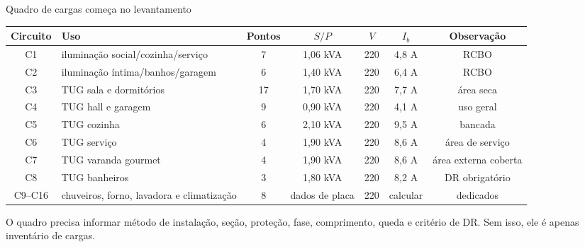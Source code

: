 \begin{frame}[shrink=5]{Quadro de cargas começa no levantamento}
\scriptsize
\begin{tabularx}{\textwidth}{c X c c c c c}
\toprule
Circuito & Uso & Pontos & $S/P$ & $V$ & $I_b$ & Observação \\
\midrule
C1 & iluminação social/cozinha/serviço & 7 & 1,06 kVA & 220 & 4,8 A & RCBO \\
C2 & iluminação íntima/banhos/garagem & 6 & 1,40 kVA & 220 & 6,4 A & RCBO \\
C3 & TUG sala e dormitórios & 17 & 1,70 kVA & 220 & 7,7 A & área seca \\
C4 & TUG hall e garagem & 9 & 0,90 kVA & 220 & 4,1 A & uso geral \\
C5 & TUG cozinha & 6 & 2,10 kVA & 220 & 9,5 A & bancada \\
C6 & TUG serviço & 4 & 1,90 kVA & 220 & 8,6 A & área de serviço \\
C7 & TUG varanda gourmet & 4 & 1,90 kVA & 220 & 8,6 A & área externa coberta \\
C8 & TUG banheiros & 3 & 1,80 kVA & 220 & 8,2 A & DR obrigatório \\
C9--C16 & chuveiros, forno, lavadora e climatização & 8 & dados de placa & 220 & calcular & dedicados \\
\bottomrule
\end{tabularx}
\vspace{1mm}
\begin{caixaAt}
O quadro precisa informar método de instalação, seção, proteção, fase, comprimento, queda e critério de DR. Sem isso, ele é apenas inventário de cargas.
\end{caixaAt}
\end{frame}

